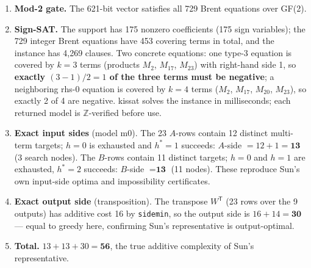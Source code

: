 \documentclass[10pt]{article}
\newcommand{\WT}{\ensuremath{W^{\mathsf T}}}
\begin{document}
\begin{enumerate}
\item \textbf{Mod-2 gate.} The 621-bit vector satisfies all 729 Brent
  equations over GF(2).
\item \textbf{Sign-SAT.} The support has 175 nonzero coefficients (175
  sign variables); the 729 integer Brent equations have 453 covering
  terms in total, and the instance has 4{,}269 clauses. Two concrete
  equations: one type-3 equation is covered by $k = 3$ terms (products
  $M_2$, $M_{17}$, $M_{23}$) with right-hand side 1, so \textbf{exactly
  $(3-1)/2 = 1$ of the three terms must be negative}; a neighboring
  rhs-0 equation is covered by $k = 4$ terms ($M_2$, $M_{17}$,
  $M_{20}$, $M_{23}$), so exactly 2 of 4 are negative. kissat solves
  the instance in milliseconds; each returned model is
  $\mathbb{Z}$-verified before use.
\item \textbf{Exact input sides} (model m0). The 23 $A$-rows contain 12
  distinct multi-term targets; $h = 0$ is exhausted and $h^{*} = 1$
  succeeds: $A$-side $= 12 + 1 = \textbf{13}$ (3 search nodes). The
  $B$-rows contain 11 distinct targets; $h = 0$ and $h = 1$ are
  exhausted, $h^{*} = 2$ succeeds: $B$-side $= \textbf{13}$ (11 nodes).
  These reproduce Sun's own input-side optima and impossibility
  certificates.
\item \textbf{Exact output side} (transposition). The transpose \WT{}
  (23 rows over the 9 outputs) has additive cost 16 by \texttt{sidemin},
  so the output side is $16 + 14 = \textbf{30}$ --- equal to greedy
  here, confirming Sun's representative is output-optimal.
\item \textbf{Total.} $13 + 13 + 30 = \textbf{56}$, the true additive
  complexity of Sun's representative.
\end{enumerate}
\end{document}
